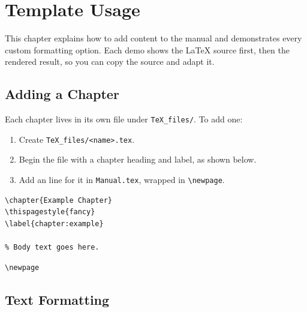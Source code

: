 \chapter{Template Usage}
\thispagestyle{fancy}
\label{chapter:template}

This chapter explains how to add content to the manual and demonstrates every custom formatting option. Each demo shows the LaTeX source first, then the rendered result, so you can copy the source and adapt it.

\section{Adding a Chapter}

Each chapter lives in its own file under \texttt{TeX\_files/}. To add one:

\begin{enumerate}
	\item Create \texttt{TeX\_files/<name>.tex}.
	\item Begin the file with a chapter heading and label, as shown below.
	\item Add an \lstinline|| line for it in \texttt{Manual.tex}, wrapped in \lstinline|\newpage|.
\end{enumerate}

\begin{lstlisting}[style=latexstyle]
% TeX_files/Example.tex
\chapter{Example Chapter}
\thispagestyle{fancy}
\label{chapter:example}

% Body text goes here.
\end{lstlisting}

\begin{lstlisting}[style=latexstyle]
% In Manual.tex, add the chapter after the last one:
\newpage

\end{lstlisting}

\section{Text Formatting}

